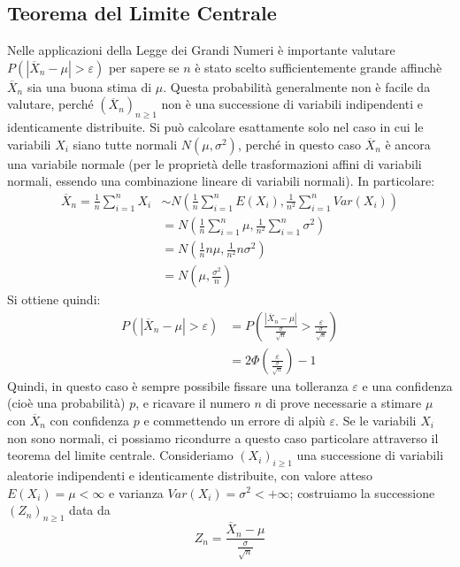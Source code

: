 \documentclass{article}
\theoremstyle{plain}
\theoremstyle{definition}
\theoremstyle{remark}
\begin{document}
\subsection{Teorema del Limite Centrale} %
\label{sub:teorema_del_limite_centrale}
Nelle applicazioni della Legge dei Grandi Numeri è importante valutare $P(|\overline{X}_n-\mu|>\varepsilon)$ per sapere se $n$ è stato scelto sufficientemente grande affinchè $\overline{X}_n$ sia una buona stima di $\mu$. Questa probabilità generalmente non è facile da valutare, perché $(\overline{X}_n)_{n\geq1}$ non è una successione di variabili indipendenti e identicamente distribuite. Si può calcolare esattamente solo nel caso in cui le variabili $X_i$ siano tutte normali $N(\mu,\sigma^2)$, perché in questo caso $\overline{X}_n$ è ancora una variabile normale (per le proprietà delle trasformazioni affini di variabili normali, essendo una combinazione lineare di variabili normali). In particolare:
\begin{align*}
	\overline{X}_n=\frac{1}{n}\sum_{i=1}^nX_i&\sim N\left(\frac{1}{n}\sum_{i=1}^nE(X_i),\frac{1}{n^2}\sum_{i=1}^nVar(X_i)\right)\\
	&=N\left(\frac{1}{n}\sum_{i=1}^n\mu,\frac{1}{n^2}\sum_{i=1}^n\sigma^2\right)\\
	&=N\left(\frac{1}{n}n\mu,\frac{1}{n^2}n\sigma^2\right)\\
	&=N\left(\mu,\frac{\sigma^2}{n}\right)
\end{align*}
Si ottiene quindi:
\begin{align*}
	P(|\overline{X}_n-\mu|>\varepsilon)&=P\left(\frac{|\overline{X}_n-\mu|}{\frac{\sigma}{\sqrt{n}}}>\frac{\varepsilon}{\frac{\sigma}{\sqrt{n}}}\right)\\
	&=2\Phi\left(\frac{\varepsilon}{\frac{\sigma}{\sqrt{n}}}\right)-1
\end{align*}
Quindi, in questo caso è sempre possibile fissare una tolleranza $\varepsilon$ e una confidenza (cioè una probabilità) $p$, e ricavare il numero $n$ di prove necessarie a stimare $\mu$ con $\overline{X}_n$ con confidenza $p$ e commettendo un errore di alpiù $\varepsilon$. Se le variabili $X_i$ non sono normali, ci possiamo ricondurre a questo caso particolare attraverso il teorema del limite centrale. Consideriamo $(X_i)_{i\geq1}$ una successione di variabili aleatorie indipendenti e identicamente distribuite, con valore atteso $E(X_i)=\mu<\infty$ e varianza $Var(X_i)=\sigma^2<+\infty$; costruiamo la successione $(Z_n)_{n\geq1}$ data da
\begin{equation*}
	Z_n=\frac{\overline{X}_n-\mu}{\frac{\sigma}{\sqrt{n}}}
\end{equation*}
\end{document}
